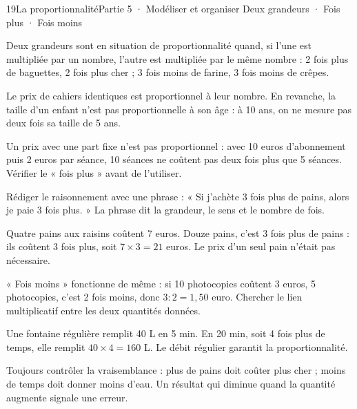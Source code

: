 \begin{ouverture}[courbe]{19}{La proportionnalité}{Partie 5 · Modéliser et organiser}
{Deux grandeurs · Fois plus · Fois moins}
\end{ouverture}
\pagestyle{otMain}\essentiel\fontsize{11}{15}\selectfont
{}\label{cours-19-1}
\begin{definition}Deux grandeurs sont en situation de proportionnalité quand, si l’une est multipliée par un nombre, l’autre est multipliée par le même nombre : 2 fois plus de baguettes, 2 fois plus cher ; 3 fois moins de farine, 3 fois moins de crêpes.\end{definition}
\begin{exemple}Le prix de cahiers identiques est proportionnel à leur nombre. En revanche, la taille d’un enfant n’est pas proportionnelle à son âge : à 10 ans, on ne mesure pas deux fois sa taille de 5 ans.\end{exemple}
\begin{attention}Un prix avec une part fixe n’est pas proportionnel : avec 10 euros d’abonnement puis 2 euros par séance, 10 séances ne coûtent pas deux fois plus que 5 séances. Vérifier le « fois plus » avant de l’utiliser.\end{attention}
\begin{savoirfaire}Rédiger le raisonnement avec une phrase : « Si j’achète 3 fois plus de pains, alors je paie 3 fois plus. » La phrase dit la grandeur, le sens et le nombre de fois.\end{savoirfaire}
\clearpage
{}\label{cours-19-2}
\begin{exemple}Quatre pains aux raisins coûtent 7 euros. Douze pains, c’est 3 fois plus de pains : ils coûtent 3 fois plus, soit $7\times3=21$ euros. Le prix d’un seul pain n’était pas nécessaire.\end{exemple}
\begin{savoirfaire}« Fois moins » fonctionne de même : si 10 photocopies coûtent 3 euros, 5 photocopies, c’est 2 fois moins, donc $3:2=1{,}50$ euro. Chercher le lien multiplicatif entre les deux quantités données.\end{savoirfaire}
\begin{exemple}Une fontaine régulière remplit 40 L en 5 min. En 20 min, soit 4 fois plus de temps, elle remplit $40\times4=160$ L. Le débit régulier garantit la proportionnalité.\end{exemple}
\begin{attention}Toujours contrôler la vraisemblance : plus de pains doit coûter plus cher ; moins de temps doit donner moins d’eau. Un résultat qui diminue quand la quantité augmente signale une erreur.\end{attention}

